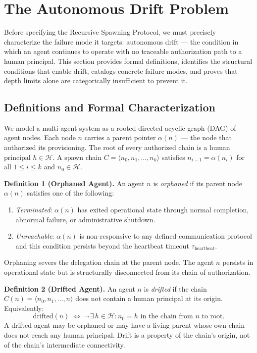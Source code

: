 \section{The Autonomous Drift Problem}
\label{sec:drift}

Before specifying the Recursive Spawning Protocol, we must precisely characterize the failure mode it targets: autonomous drift — the condition in which an agent continues to operate with no traceable authorization path to a human principal. This section provides formal definitions, identifies the structural conditions that enable drift, catalogs concrete failure modes, and proves that depth limits alone are categorically insufficient to prevent it.

\subsection{Definitions and Formal Characterization}

We model a multi-agent system as a rooted directed acyclic graph (DAG) of agent nodes. Each node $n$ carries a parent pointer $\alpha(n)$ — the node that authorized its provisioning. The root of every authorized chain is a human principal $h \in \mathcal{H}$. A spawn chain $C = \langle n_0, n_1, \ldots, n_k \rangle$ satisfies $n_{i-1} = \alpha(n_i)$ for all $1 \leq i \leq k$ and $n_0 \in \mathcal{H}$.

\medskip
\noindent\textbf{Definition 1 (Orphaned Agent).}
An agent $n$ is \emph{orphaned} if its parent node $\alpha(n)$ satisfies one of the following:
\begin{enumerate}
  \item[(a)] \emph{Terminated}: $\alpha(n)$ has exited operational state through normal completion, abnormal failure, or administrative shutdown.
  \item[(b)] \emph{Unreachable}: $\alpha(n)$ is non-responsive to any defined communication protocol and this condition persists beyond the heartbeat timeout $\tau_{\mathrm{heartbeat}}$.
\end{enumerate}
Orphaning severs the delegation chain at the parent node. The agent $n$ persists in operational state but is structurally disconnected from its chain of authorization.

\medskip
\noindent\textbf{Definition 2 (Drifted Agent).}
An agent $n$ is \emph{drifted} if the chain $C(n) = \langle n_0, n_1, \ldots, n \rangle$ does not contain a human principal at its origin. Equivalently:
\begin{equation}
\mathrm{drifted}(n) \;\iff\; \neg\,\exists\, h \in \mathcal{H} : n_0 = h \text{ in the chain from } n \text{ to root}.
\label{eq:drifted-def}
\end{equation}
A drifted agent may be orphaned or may have a living parent whose own chain does not reach any human principal. Drift is a property of the chain's origin, not of the chain's intermediate connectivity.

